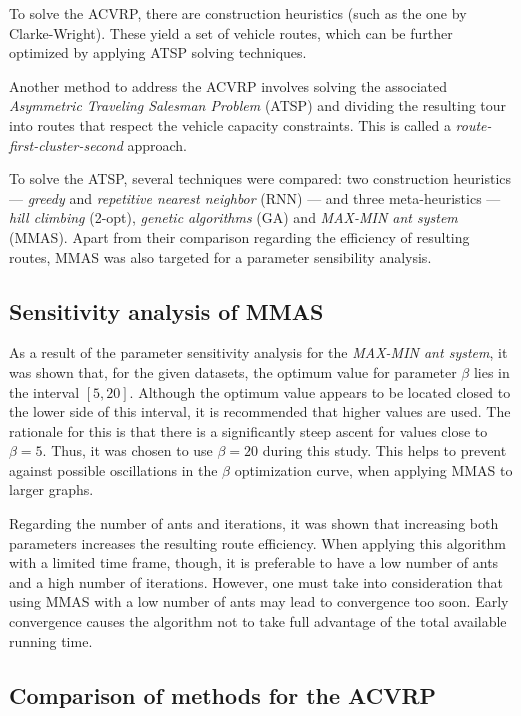 To solve the ACVRP, there are construction heuristics (such as the one by
Clarke-Wright). These yield a set of vehicle routes, which can be further
optimized by applying ATSP solving techniques.

Another method to address the ACVRP involves solving the associated
\textit{Asymmetric Traveling Salesman Problem} (ATSP) and dividing the resulting
tour into routes that respect the vehicle capacity constraints. This is called a
\textit{route-first-cluster-second} approach.

To solve the ATSP, several techniques were compared: two construction
heuristics --- \textit{greedy} and \textit{repetitive nearest neighbor} (RNN)
--- and three meta-heuristics --- \textit{hill climbing} (2-opt),
\textit{genetic algorithms} (GA) and \textit{MAX-MIN ant system} (MMAS).
Apart from their comparison regarding the efficiency of resulting routes,
MMAS was also targeted for a parameter sensibility analysis.

\subsection{Sensitivity analysis of MMAS}

As a result of the parameter sensitivity analysis for the \textit{MAX-MIN ant
system}, it was shown that, for the given datasets, the optimum value for
parameter $\beta$ lies in the interval $[5, 20]$. Although the optimum value
appears to be located closed to the lower side of this interval, it is
recommended that higher values are used. The rationale for this is that there is
a significantly steep ascent for values close to $\beta=5$. Thus, it was chosen
to use $\beta=20$ during this study. This helps to prevent against possible
oscillations in the $\beta$ optimization curve, when applying MMAS to larger
graphs.

Regarding the number of ants and iterations, it was shown that increasing both
parameters increases the resulting route efficiency. When applying this
algorithm with a limited time frame, though, it is preferable to have a low
number of ants and a high number of iterations. However, one must take into
consideration that using MMAS with a low number of ants may lead to convergence
too soon. Early convergence causes the algorithm not to take full advantage of
the total available running time.

\subsection{Comparison of methods for the ACVRP}


